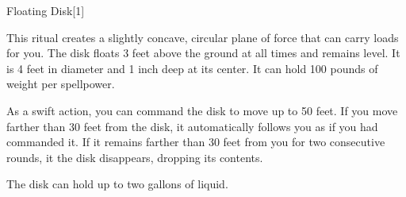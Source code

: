 \begin{spellsection}{Floating Disk}[1]
    \begin{spellheader}
    \end{spellheader}
    \begin{spellcontent}
        \begin{spelltargetinginfo}
            \spellrng{\rngmed}
        \end{spelltargetinginfo}
        \begin{spelleffects}

            \spellline
            \spelleffect This ritual creates a slightly concave, circular plane of force that can carry loads for you. The disk floats 3 feet above the ground at all times and remains level. It is 4 feet in diameter and 1 inch deep at its center. It can hold 100 pounds of weight per spellpower.

            As a swift action, you can command the disk to move up to 50 feet. If you move farther than 30 feet from the disk, it automatically follows you as if you had commanded it. If it remains farther than 30 feet from you for two consecutive rounds, it the disk disappears, dropping its contents.
            \spelldur \durext \dismissable
        \end{spelleffects}
    \end{spellcontent}
    \begin{spellfooter}
        \spellnotes The disk can hold up to two gallons of liquid.
    \end{spellfooter}
\end{spellsection}

